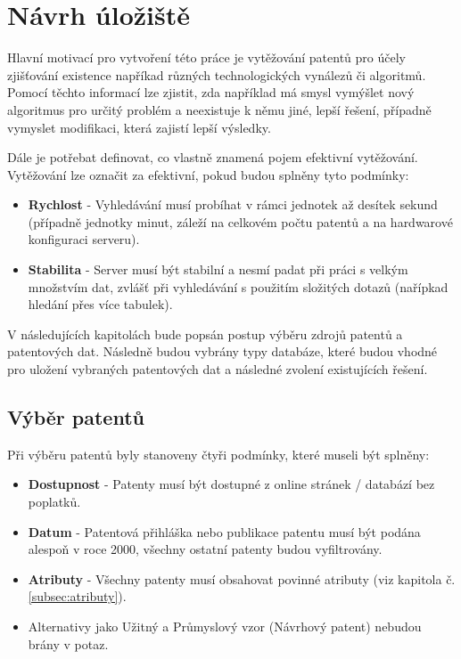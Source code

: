 \chapter{Návrh úložiště}
Hlavní motivací pro vytvoření této práce je vytěžování patentů pro účely zjišťování existence napříkad různých technologických vynálezů či algoritmů. Pomocí těchto informací lze zjistit, zda například má smysl vymýšlet nový algoritmus pro určitý problém a neexistuje k němu jiné, lepší řešení, případně vymyslet modifikaci, která zajistí lepší výsledky.
\newline

\noindent Dále je potřebat definovat, co vlastně znamená pojem efektivní vytěžování. Vytěžování lze označit za efektivní, pokud budou splněny tyto podmínky:
\begin{itemize}
\item \textbf{Rychlost} - Vyhledávání musí probíhat v rámci jednotek až desítek sekund (případně jednotky minut, záleží na celkovém počtu patentů a na hardwarové konfiguraci serveru).
\item \textbf{Stabilita} - Server musí být stabilní a nesmí padat při práci s velkým množstvím dat, zvlášť při vyhledávání s použitím složitých dotazů (nařípkad hledání přes více tabulek).
\end{itemize}

\noindent V následujících kapitolách bude popsán postup výběru zdrojů patentů a patentových dat. Následně budou vybrány typy databáze, které budou vhodné pro uložení vybraných patentových dat a následné zvolení existujících řešení.

\section{Výběr patentů}
Při výběru patentů byly stanoveny čtyři podmínky, které museli být splněny:
\begin{itemize}
\item \textbf{Dostupnost} - Patenty musí být dostupné z online stránek / databází bez poplatků.
\item \textbf{Datum} - Patentová přihláška nebo publikace patentu musí být podána alespoň v roce 2000, všechny ostatní patenty budou vyfiltrovány.
\item \textbf{Atributy} - Všechny patenty musí obsahovat povinné atributy (viz kapitola č. \ref{subsec:atributy}).
\item Alternativy jako Užitný a Průmyslový vzor (Návrhový patent) nebudou brány v potaz.
\end{itemize}

